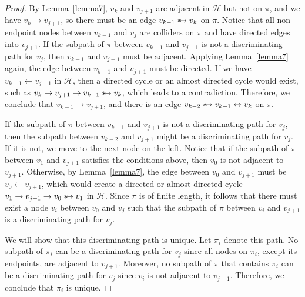 \documentclass[accepted]{uai2025} %
\newcommand{\huh}{\mathrel{\leftrightarrow}}
\newcommand{\suh}{\mathrel{{\ast\mkern-11mu\to}}}
\begin{document}
\begin{proof}
By Lemma~\ref{lemma7}, \( v_k \) and \( v_{j+1} \) are adjacent in \( \mathcal{H} \) but not on \( \pi \), and we have \( v_k \rightarrow v_{j+1} \), so there must be an edge \( v_{k-1} \suh v_k \) on \( \pi \). Notice that all non-endpoint nodes between \( v_{k-1} \) and \( v_j \) are colliders on \( \pi \) and have directed edges into \( v_{j+1} \). If the subpath of \( \pi \) between \( v_{k-1} \) and \( v_{j+1} \) is not a discriminating path for \( v_j \), then \( v_{k-1} \) and \( v_{j+1} \) must be adjacent. Applying Lemma~\ref{lemma7} again, the edge between \( v_{k-1} \) and \( v_{j+1} \) must be directed. If we have \( v_{k-1} \leftarrow v_{j+1} \) in \( \mathcal{H} \), then a directed cycle or an almost directed cycle would exist, such as \( v_k \rightarrow v_{j+1} \rightarrow v_{k-1} \suh v_k \), which leads to a contradiction. Therefore, we conclude that \( v_{k-1} \rightarrow v_{j+1} \), and there is an edge \( v_{k-2} \suh v_{k-1} \huh  v_k \) on \( \pi \).

If the subpath of \( \pi \) between \( v_{k-1} \) and \( v_{j+1} \) is not a discriminating path for \( v_j \), then the subpath between \( v_{k-2} \) and \( v_{j+1} \) might be a discriminating path for \( v_j \). If it is not, we move to the next node on the left. Notice that if the subpath of \( \pi \) between \( v_1 \) and \( v_{j+1} \) satisfies the conditions above, then \( v_0 \) is not adjacent to \( v_{j+1} \). Otherwise, by Lemma~\ref{lemma7}, the edge between \( v_0 \) and \( v_{j+1} \) must be \( v_0 \leftarrow v_{j+1} \), which would create a directed or almost directed cycle \( v_1 \rightarrow v_{j+1} \rightarrow v_0 \suh v_1 \) in \( \mathcal{H} \). Since \( \pi \) is of finite length, it follows that there must exist a node \( v_i \) between \( v_0 \) and \( v_j \) such that the subpath of \( \pi \) between \( v_i \) and \( v_{j+1} \) is a discriminating path for \( v_j \).

We will show that this discriminating path is unique. Let \( \pi_i \) denote this path. No subpath of \( \pi_i \) can be a discriminating path for \( v_j \) since all nodes on \( \pi_i \), except its endpoints, are adjacent to \( v_{j+1} \). Moreover, no subpath of \( \pi \) that contains \( \pi_i \) can be a discriminating path for \( v_j \) since \( v_i \) is not adjacent to \( v_{j+1} \). Therefore, we conclude that \( \pi_i \) is unique.
\end{proof}
\end{document}
